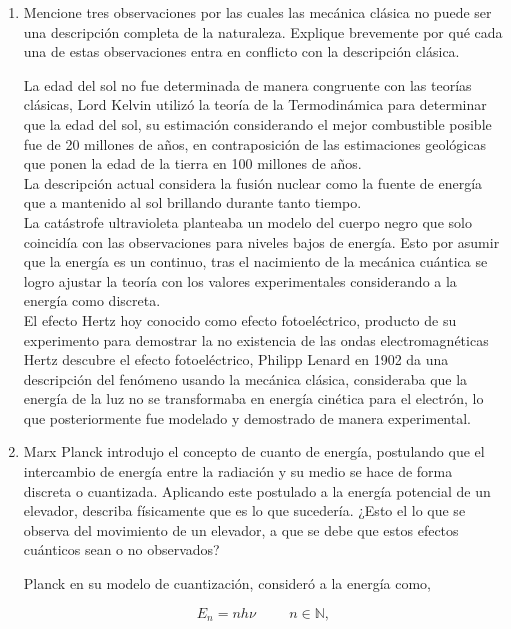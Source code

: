 \documentclass[12pt,a4paper]{article}
\begin{document}
\begin{enumerate}

\item Mencione tres observaciones por las cuales las mecánica clásica no puede ser una descripción completa de la naturaleza.
Explique brevemente por qué cada una de estas observaciones entra en conflicto con la descripción clásica.


La edad del sol no fue determinada de manera congruente con las teorías clásicas, Lord Kelvin utilizó la teoría de la Termodinámica para determinar que la edad del sol, su estimación considerando el mejor combustible posible fue de 20 millones de años, en contraposición de las estimaciones geológicas que ponen la edad de la tierra en 100 millones de años. \\
La descripción actual considera la fusión nuclear como la fuente de energía que a mantenido al sol brillando durante tanto tiempo.\\

La catástrofe ultravioleta planteaba un modelo del cuerpo negro que solo coincidía con las observaciones para niveles bajos de energía. Esto por asumir que la energía es un continuo, tras el nacimiento de la mecánica cuántica se logro ajustar la teoría con los valores experimentales considerando a la energía como discreta.\\

El efecto Hertz hoy conocido como efecto fotoeléctrico, producto de su experimento para demostrar la no existencia de las ondas electromagnéticas Hertz descubre el efecto fotoeléctrico, Philipp Lenard en 1902 da una descripción del fenómeno usando la mecánica clásica, consideraba que la energía de la luz no se transformaba en energía cinética para el electrón, lo que posteriormente fue modelado y demostrado de manera experimental.\\

\item Marx Planck introdujo el concepto de cuanto de energía, postulando que el intercambio de energía entre la radiación y su medio se hace de forma discreta o cuantizada. Aplicando este postulado a la energía potencial de un elevador, describa físicamente que es lo que sucedería. ¿Esto el lo que se observa del movimiento de un elevador, a que se debe que estos efectos cuánticos sean o no observados?

Planck en su modelo de cuantización, consideró a la energía como,

\[
E_{n} = n h \nu \hspace{1cm} n \in \mathbb{N},
\]


\end{enumerate}
\end{document}
